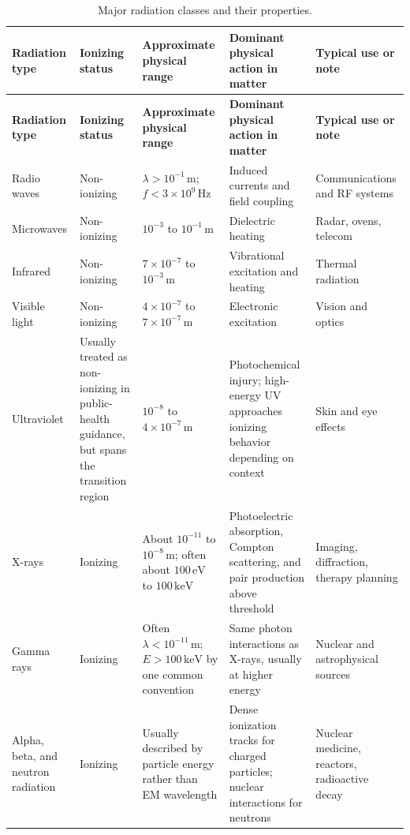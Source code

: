 \documentclass[12pt]{article}
\begin{document}
\begin{longtable}{p{} p{} p{} p{} p{}}
\caption{Major radiation classes and their properties.}\\
\toprule
\textbf{Radiation type} & \textbf{Ionizing status} & \textbf{Approximate physical range} & \textbf{Dominant physical action in matter} & \textbf{Typical use or note}\\
\midrule
\endfirsthead

\toprule
\textbf{Radiation type} & \textbf{Ionizing status} & \textbf{Approximate physical range} & \textbf{Dominant physical action in matter} & \textbf{Typical use or note}\\
\midrule
\endhead

Radio waves & Non-ionizing & $\lambda > 10^{-1}\,\mathrm{m}$; $f < 3\times 10^9\,\mathrm{Hz}$ & Induced currents and field coupling & Communications and RF systems\\

Microwaves & Non-ionizing & $10^{-3}$ to $10^{-1}\,\mathrm{m}$ & Dielectric heating & Radar, ovens, telecom\\

Infrared & Non-ionizing & $7\times 10^{-7}$ to $10^{-3}\,\mathrm{m}$ & Vibrational excitation and heating & Thermal radiation\\

Visible light & Non-ionizing & $4\times 10^{-7}$ to $7\times 10^{-7}\,\mathrm{m}$ & Electronic excitation & Vision and optics\\

Ultraviolet & Usually treated as non-ionizing in public-health guidance, but spans the transition region & $10^{-8}$ to $4\times 10^{-7}\,\mathrm{m}$ & Photochemical injury; high-energy UV approaches ionizing behavior depending on context & Skin and eye effects\\

X-rays & Ionizing & About $10^{-11}$ to $10^{-8}\,\mathrm{m}$; often about $100\,\mathrm{eV}$ to $100\,\mathrm{keV}$ & Photoelectric absorption, Compton scattering, and pair production above threshold & Imaging, diffraction, therapy planning\\

Gamma rays & Ionizing & Often $\lambda < 10^{-11}\,\mathrm{m}$; $E > 100\,\mathrm{keV}$ by one common convention & Same photon interactions as X-rays, usually at higher energy & Nuclear and astrophysical sources\\

Alpha, beta, and neutron radiation & Ionizing & Usually described by particle energy rather than EM wavelength & Dense ionization tracks for charged particles; nuclear interactions for neutrons & Nuclear medicine, reactors, radioactive decay\\
\bottomrule
\end{longtable}
\end{document}
